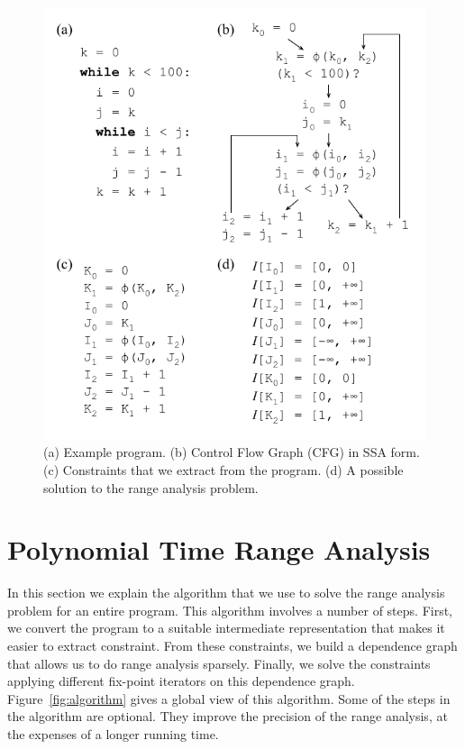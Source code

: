 \documentclass[preprint]{sigplanconf}
\begin{document}
\begin{figure}[t!]
\begin{center}
\includegraphics[width=\columnwidth]{images/ex1}
\end{center}
\caption{\label{fig:ex1}
(a) Example program.
(b) Control Flow Graph (CFG) in SSA form.
(c) Constraints that we extract from the program.
(d) A possible solution to the range analysis problem.}
\end{figure}


\section{Polynomial Time Range Analysis}
\label{sec:algo}


In this section we explain the algorithm that we use to solve the range
analysis problem for an entire program.
This algorithm involves a number of steps.
First, we convert the program to a suitable intermediate representation that
makes it easier to extract constraint.
From these constraints, we build a dependence graph that allows us to do
range analysis sparsely.
Finally, we solve the constraints applying different fix-point iterators on
this dependence graph.
Figure~\ref{fig:algorithm} gives a global view of this algorithm.
Some of the steps in the algorithm are optional.
They improve the precision of the range analysis, at the expenses of a longer
running time.
\end{document}
